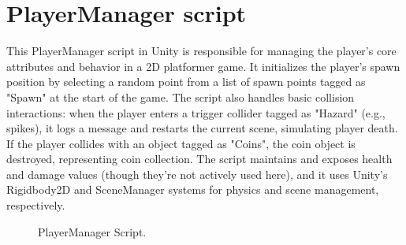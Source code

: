 \documentclass[12pt,oneside,openright,a4paper]{cpe-english-project}
\begin{document}
\section{PlayerManager script}
This PlayerManager script in Unity is responsible for managing the player's core attributes and behavior in a 2D platformer game. It initializes the player’s spawn position by selecting a random point from a list of spawn points tagged as "Spawn" at the start of the game. The script also handles basic collision interactions: when the player enters a trigger collider tagged as "Hazard" (e.g., spikes), it logs a message and restarts the current scene, simulating player death. If the player collides with an object tagged as "Coins", the coin object is destroyed, representing coin collection. The script maintains and exposes health and damage values (though they're not actively used here), and it uses Unity’s Rigidbody2D and SceneManager systems for physics and scene management, respectively.\par
 \begin{figure}[!h]
 \centering
\caption{PlayerManager Script.}\label{fig:PlayerM}
\end{figure}
\newpage
\end{document}
